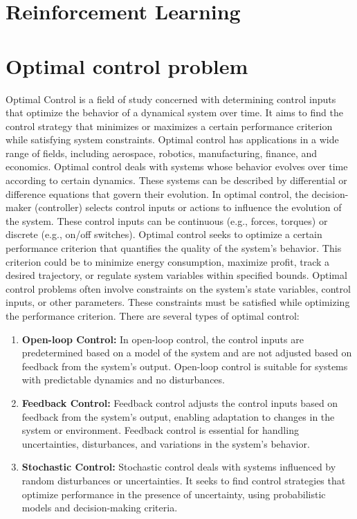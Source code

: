 \documentclass[letterpaper, 10 pt, conference]{ieeeconf}  %
\begin{document}
	\section{Reinforcement Learning}
	
	\section{Optimal control problem}
	Optimal Control is a field of study concerned with determining control inputs that optimize the behavior of a dynamical system over time. It aims to find the control strategy that minimizes or maximizes a certain performance criterion while satisfying system constraints. Optimal control has applications in a wide range of fields, including aerospace, robotics, manufacturing, finance, and economics. Optimal control deals with systems whose behavior evolves over time according to certain dynamics. These systems can be described by differential or difference equations that govern their evolution. In optimal control, the decision-maker (controller) selects control inputs or actions to influence the evolution of the system. These control inputs can be continuous (e.g., forces, torques) or discrete (e.g., on/off switches). Optimal control seeks to optimize a certain performance criterion that quantifies the quality of the system's behavior. This criterion could be to minimize energy consumption, maximize profit, track a desired trajectory, or regulate system variables within specified bounds.  Optimal control problems often involve constraints on the system's state variables, control inputs, or other parameters. These constraints must be satisfied while optimizing the performance criterion. There are several types of optimal control:
	\begin{enumerate}
		\item \textbf{Open-loop Control:} In open-loop control, the control inputs are predetermined based on a model of the system and are not adjusted based on feedback from the system's output. Open-loop control is suitable for systems with predictable dynamics and no disturbances.
		
		\item \textbf{Feedback Control:} Feedback control adjusts the control inputs based on feedback from the system's output, enabling adaptation to changes in the system or environment. Feedback control is essential for handling uncertainties, disturbances, and variations in the system's behavior.
		
		\item \textbf{Stochastic Control:} Stochastic control deals with systems influenced by random disturbances or uncertainties. It seeks to find control strategies that optimize performance in the presence of uncertainty, using probabilistic models and decision-making criteria.
	\end{enumerate}
\end{document}
